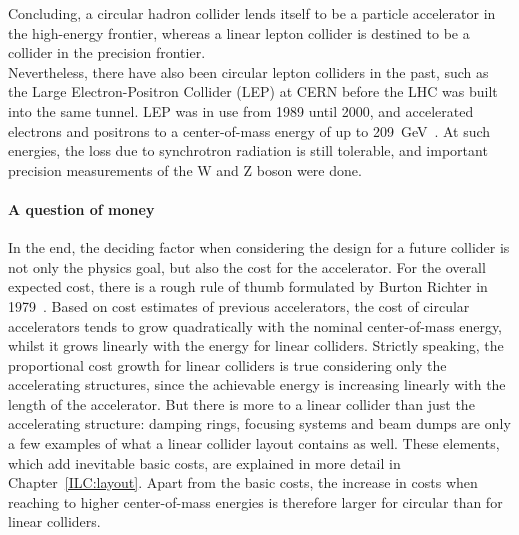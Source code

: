 Concluding, a circular hadron collider lends itself to be a particle accelerator in the high-energy frontier, whereas a linear lepton collider is destined to be a collider in the precision frontier.
\\
Nevertheless, there have also been circular lepton colliders in the past, such as the Large Electron-Positron Collider (LEP) at CERN before the LHC was built into the same tunnel.
LEP was in use from 1989 until 2000, and accelerated electrons and positrons to a center-of-mass energy of up to \SI{209}{\GeV}~\cite{LEP}.
At such energies, the loss due to synchrotron radiation is still tolerable, and important precision measurements of the W and Z boson were done.

\paragraph{A question of money}
In the end, the deciding factor when considering the design for a future collider is not only the physics goal, but also the cost for the accelerator.
For the overall expected cost, there is a rough rule of thumb formulated by Burton Richter in 1979~\cite[p. 87ff]{Richter}.
Based on cost estimates of previous accelerators, the cost of circular accelerators tends to grow quadratically with the nominal center-of-mass energy, whilst it grows linearly with the energy for linear colliders.
Strictly speaking, the proportional cost growth for linear colliders is true considering only the accelerating structures, since the achievable energy is increasing linearly with the length of the accelerator.
But there is more to a linear collider than just the accelerating structure: damping rings, focusing systems and beam dumps are only a few examples of what a linear collider layout contains as well.
These elements, which add inevitable basic costs, are explained in more detail in Chapter~\ref{ILC:layout}.
Apart from the basic costs, the increase in costs when reaching to higher center-of-mass energies is therefore larger for circular than for linear colliders.

